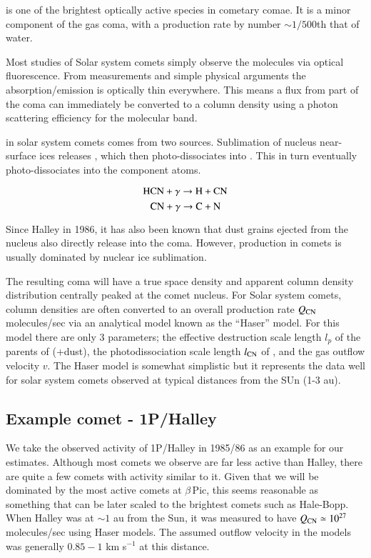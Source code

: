 \documentclass{aa}
\newcommand{\kms}{km s$^{-1}$}
\newcommand{\bp}{$\beta$\,Pic}
\begin{document}
 is one of the brightest optically active species in cometary comae.
%
It is a minor component of the gas coma, with a production rate by number $\sim 1/500$th that of water. 

Most studies of Solar system comets simply observe the  molecules via optical fluorescence.
%
From measurements and simple physical arguments the  absorption/emission is optically thin everywhere.
%
This means a flux from part of the coma can immediately be converted to a column density using a photon scattering efficiency for the molecular band.

 in solar system comets comes from two sources.
%
Sublimation of nucleus near-surface ices releases , which then photo-dissociates into .
%
This in turn eventually photo-dissociates into the component atoms.

$$\ce{HCN} +\gamma \rightarrow \ce{H}+\ce{CN}$$
$$\ce{CN} + \gamma \rightarrow \ce{C}+\ce{N}$$

Since Halley in 1986, it has also been known that dust grains ejected from the nucleus also directly release  into the coma.
%
However,  production in comets is usually dominated by nuclear ice sublimation.

The resulting  coma will have a true space density and apparent column density distribution centrally peaked at the comet nucleus.
%
For Solar system comets, column densities are often converted to an overall production rate $Q_{\ce{CN}}$ molecules/sec via an analytical model known as the ``Haser'' model.
%
For this model there are only 3 parameters; the effective destruction scale length $l_p$ of the parents of  (+dust), the photodissociation scale length $l_{\ce{CN}}$ of , and the gas outflow velocity $v$.
%
The Haser model is somewhat simplistic but it represents the data well for solar system comets observed at typical distances from the SUn (1-3 au).

\subsection{Example comet - 1P/Halley}

We take the observed activity of 1P/Halley in 1985/86 as an example for our estimates.
%
Although most comets we observe are far less active than Halley, there are quite a few comets with activity similar to it.
%
Given that we will be dominated by the most active comets at \bp{}, this seems reasonable as something that can be later scaled to the brightest comets such as Hale-Bopp.
%
When Halley was at $\sim 1$ au from the Sun, it was measured to have $Q_{\ce{CN}}\simeq 10^{27}$ molecules/sec using Haser models.
%
The assumed outflow velocity in the models was generally  $0.85 - 1$ \kms{} at this distance.
\end{document}

